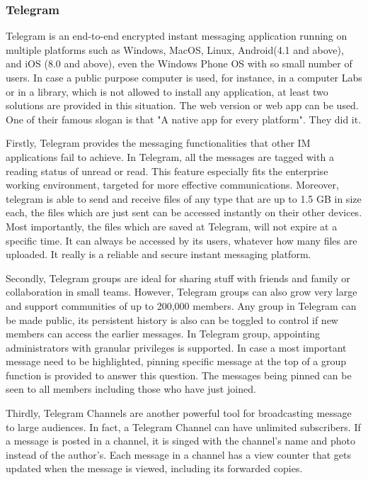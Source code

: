 \subsubsection{Telegram}

Telegram is an end-to-end encrypted instant messaging application running on multiple platforms such as Windows, MacOS, Linux, Android(4.1 and above), and iOS (8.0 and above), even the Windows Phone OS with so small number of users. In case a public purpose computer is used, for instance, in a computer Labs or in a library, which is not allowed to install any application, at least two solutions are provided in this situation. The web version or web app can be used. One of their famous slogan is that "A native app for every platform". They did it.

Firstly, Telegram provides the messaging functionalities that other IM applications fail to achieve. In Telegram, all the messages are tagged with a reading status of unread or read. This feature especially fits the enterprise working environment, targeted for more effective communications. Moreover, telegram is able to send and receive files of any type that are up to 1.5 GB in size each, the files which are just sent can be accessed instantly on their other devices. Most importantly, the files which are saved at Telegram, will not expire at a specific time. It can always be accessed by its users, whatever how many files are uploaded. It really is a reliable and secure instant messaging platform.

Secondly, Telegram groups are ideal for sharing stuff with friends and family or collaboration in small teams. However, Telegram groups can also grow very large and support communities of up to 200,000 members. Any group in Telegram can be made public, its persistent history is also can be toggled to control if new members can access the earlier messages. In Telegram group, appointing administrators with granular privileges is supported. In case a most important message need to be highlighted, pinning specific message at the top of a group function is provided to answer this question. The messages being pinned can be seen to all members including those who have just joined.

Thirdly, Telegram Channels are another powerful tool for broadcasting message to large audiences. In fact, a Telegram Channel can have unlimited subscribers. If a message is posted in a channel, it is singed with the channel's name and photo instead of the author's. Each message in a channel has a view counter that gets updated when the message is viewed, including its forwarded copies.

